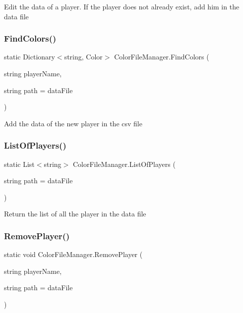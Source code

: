 Edit the data of a player. If the player does not already exist, add him in the data file \mbox{\label{class_color_file_manager_a3836ee29f11c6a7fa60b1ae3c89582d5}} 
\subsubsection{\texorpdfstring{Find\+Colors()}{FindColors()}}
{\footnotesize\ttfamily static Dictionary$<$string, Color$>$ Color\+File\+Manager.\+Find\+Colors (\begin{DoxyParamCaption}\item[{string}]{player\+Name,  }\item[{string}]{path = {\ttfamily dataFile} }\end{DoxyParamCaption})\hspace{0.3cm}{\ttfamily [static]}}

Add the data of the new player in the csv file \mbox{\label{class_color_file_manager_aa548375d447b63be2862d93dacca3b24}} 
\subsubsection{\texorpdfstring{List\+Of\+Players()}{ListOfPlayers()}}
{\footnotesize\ttfamily static List$<$string$>$ Color\+File\+Manager.\+List\+Of\+Players (\begin{DoxyParamCaption}\item[{string}]{path = {\ttfamily dataFile} }\end{DoxyParamCaption})\hspace{0.3cm}{\ttfamily [static]}}

Return the list of all the player in the data file \mbox{\label{class_color_file_manager_a73094e85b36ea78788ee84733c419fbd}} 
\subsubsection{\texorpdfstring{Remove\+Player()}{RemovePlayer()}}
{\footnotesize\ttfamily static void Color\+File\+Manager.\+Remove\+Player (\begin{DoxyParamCaption}\item[{string}]{player\+Name,  }\item[{string}]{path = {\ttfamily dataFile} }\end{DoxyParamCaption})\hspace{0.3cm}{\ttfamily [static]}}

